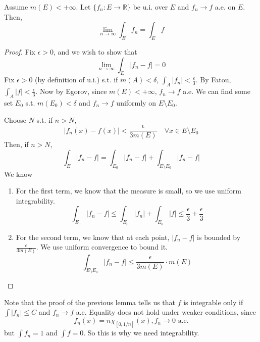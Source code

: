   \begin{theorem}
    Assume $m(E) < +\infty$. Let $\{f_n: E \to \mathbb{R}\}$ be u.i. over $E$ and $f_n \to f$ a.e. on $E$. Then, 
    \begin{equation}
      \lim_{n \to \infty} \int_E f_n = \int_E f
    \end{equation}
  \end{theorem}
  \begin{proof}
    Fix $\epsilon > 0$, and we wish to show that 
    \begin{equation}
      \lim_{n \to \infty} \int_E |f_n - f| = 0
    \end{equation}
    Fix $\epsilon > 0$ (by definition of u.i.) s.t. if $m(A) < \delta$, $\int_A |f_n| < \frac{\epsilon}{3}$. By Fatou, $\int_A |f| < \frac{\epsilon}{3}$. Now by Egorov, since $m(E) < +\infty$, $f_n \to f$ a.e. We can find some set $E_0$ s.t. $m(E_0) < \delta$ and $f_n \to f$ uniformly on $E \setminus E_0$. 

    Choose $N$ s.t. if $n > N$, 
    \begin{equation}
      |f_n (x) - f(x)| < \frac{\epsilon}{3 m(E)} \quad \forall x \in E \setminus E_0
    \end{equation}
    Then, if $n > N$, 
    \begin{equation}
      \int_E |f_n - f| = \int_{E_0} |f_n - f| + \int_{E \setminus E_0} |f_n - f|
    \end{equation}
    We know 
    \begin{enumerate}
      \item For the first term, we know that the measure is small, so we use uniform integrability. 
      \begin{equation}
        \int_{E_0} |f_n - f| \leq \int_{E_0} |f_n| + \int_{E_0} |f| \leq \frac{\epsilon}{3} + \frac{\epsilon}{3} 
      \end{equation}

      \item For the second term, we know that at each point, $|f_n - f|$ is bounded by $\frac{\epsilon}{3 m(E)}$. We use uniform convergence to bound it. 
      \begin{equation}
        \int_{E \setminus E_0} |f_n - f| \leq \frac{\epsilon}{3 m(E)} \cdot m(E)
      \end{equation}
    \end{enumerate}
  \end{proof}

  Note that the proof of the previous lemma tells us that $f$ is integrable only if $\int |f_n| \leq C$ and $f_n \to f$ a.e. Equality does not hold under weaker conditions, since 
  \begin{equation}
    f_n (x) = n \chi_{[0, 1/n]} (x), f_n \to 0 \text{ a.e.}
  \end{equation}
  but $\int f_n = 1$ and $\int f = 0$. So this is why we need integrability. 


